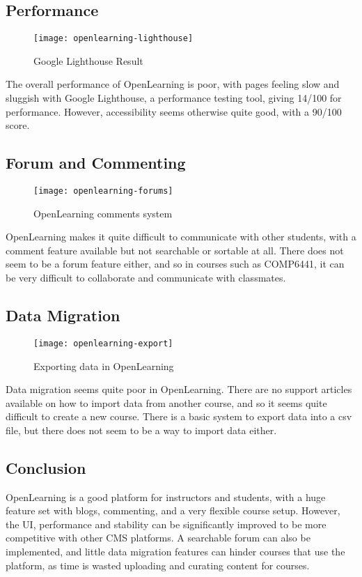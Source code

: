 \subsection{Performance}
\begin{figure}[h!]
    \centering
    \texttt{[image: openlearning-lighthouse]}
    \caption{Google Lighthouse Result}
\end{figure}
The overall performance of OpenLearning is poor, with pages feeling slow and sluggish with Google Lighthouse, a performance testing tool\cite{googleLighthouse}, giving 14/100 for performance. However, accessibility seems otherwise quite good, with a 90/100 score. \\

\subsection{Forum and Commenting}
\begin{figure}[h!]
    \centering
    \texttt{[image: openlearning-forums]}
    \caption{OpenLearning comments system}
\end{figure}
OpenLearning makes it quite difficult to communicate with other students, with a comment feature available but not searchable or sortable at all. There does not seem to be a forum feature either, and so in courses such as COMP6441, it can be very difficult to collaborate and communicate with classmates. \\


\subsection{Data Migration}
\begin{figure}[h!]
    \centering
    \texttt{[image: openlearning-export]}
    \caption{Exporting data in OpenLearning}
\end{figure}
Data migration seems quite poor in OpenLearning. There are no support articles available on how to import data from another course, and so it seems quite difficult to create a new course. There is a basic system to export data into a csv file\cite{openlearningCsv}, but there does not seem to be a way to import data either.

\subsection{Conclusion}
OpenLearning is a good platform for instructors and students, with a huge feature set with blogs, commenting, and a very flexible course setup. However, the UI, performance and stability can be significantly improved to be more competitive with other CMS platforms. A searchable forum can also be implemented, and little data migration features can hinder courses that use the platform, as time is wasted uploading and curating content for courses.

